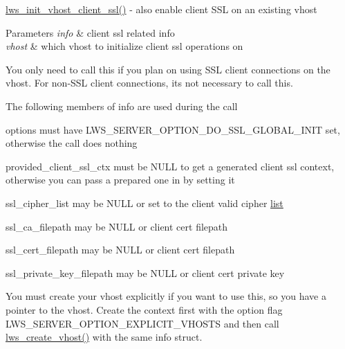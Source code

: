 \hyperlink{group__client_ga4f44b8230e6732816ca5cd8d1aaaf340}{lws\+\_\+init\+\_\+vhost\+\_\+client\+\_\+ssl()} -\/ also enable client S\+SL on an existing vhost


\begin{DoxyParams}{Parameters}
{\em info} & client ssl related info \\
\hline
{\em vhost} & which vhost to initialize client ssl operations on\\
\hline
\end{DoxyParams}
You only need to call this if you plan on using S\+SL client connections on the vhost. For non-\/\+S\+SL client connections, it\textquotesingle{}s not necessary to call this.

The following members of info are used during the call


\begin{DoxyItemize}
\item options must have L\+W\+S\+\_\+\+S\+E\+R\+V\+E\+R\+\_\+\+O\+P\+T\+I\+O\+N\+\_\+\+D\+O\+\_\+\+S\+S\+L\+\_\+\+G\+L\+O\+B\+A\+L\+\_\+\+I\+N\+IT set, otherwise the call does nothing
\item provided\+\_\+client\+\_\+ssl\+\_\+ctx must be N\+U\+LL to get a generated client ssl context, otherwise you can pass a prepared one in by setting it
\item ssl\+\_\+cipher\+\_\+list may be N\+U\+LL or set to the client valid cipher \hyperlink{protocollist-p}{list}
\item ssl\+\_\+ca\+\_\+filepath may be N\+U\+LL or client cert filepath
\item ssl\+\_\+cert\+\_\+filepath may be N\+U\+LL or client cert filepath
\item ssl\+\_\+private\+\_\+key\+\_\+filepath may be N\+U\+LL or client cert private key
\end{DoxyItemize}

You must create your vhost explicitly if you want to use this, so you have a pointer to the vhost. Create the context first with the option flag L\+W\+S\+\_\+\+S\+E\+R\+V\+E\+R\+\_\+\+O\+P\+T\+I\+O\+N\+\_\+\+E\+X\+P\+L\+I\+C\+I\+T\+\_\+\+V\+H\+O\+S\+TS and then call \hyperlink{group__context-and-vhost_ga23a77adebff95ab8341a7143654b35c7}{lws\+\_\+create\+\_\+vhost()} with the same info struct. 